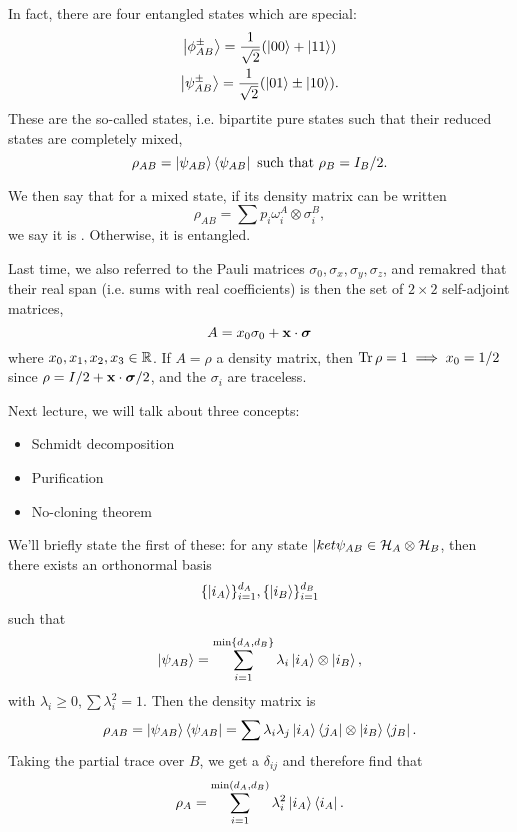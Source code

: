 In fact, there are four entangled states which are special:
\begin{gather}
    \left| \phi^\pm_{AB} \right>=\frac{1}{\sqrt{2}}(\left| 00 \right>+\left| 11 \right>)\\
    \left| \psi^\pm_{AB} \right> = \frac{1}{\sqrt{2}}(\left| 01 \right>\pm \left| 10 \right>).
\end{gather}
These are the so-called  states, i.e. bipartite pure states such that their reduced states are completely mixed,
\begin{equation}
    \rho_{AB}=\left| \psi_{AB} \right>\left< \psi_{AB} \right|\text{ such that }\rho_B=I_B/2.
\end{equation}

We then say that for a mixed state, if its density matrix can be written
\begin{equation}
    \rho_{AB} = \sum p_i \omega_i^A \otimes \sigma_i^B,
\end{equation}
we say it is . Otherwise, it is entangled.

Last time, we also referred to the Pauli matrices $\sigma_0,\sigma_x,\sigma_y,\sigma_z$, and remakred that their real span (i.e. sums with real coefficients) is then the set of $2\times 2$ self-adjoint matrices,
\begin{equation*}
    A=x_0\sigma_0 +\boldsymbol{\mathbf{x}} \cdot \mbox{\boldmath$ \sigma $}
\end{equation*}
where $x_0,x_1,x_2,x_3\in \mathbb{R}$. If $A=\rho$ a density matrix, then $\operatorname{Tr} \rho=1 \implies x_0=1/2$ since $\rho=I/2 + \boldsymbol{\mathbf{x}} \cdot \mbox{\boldmath$ \sigma $}/2$, and the $\sigma_i$ are traceless.

Next lecture, we will talk about three concepts:
\begin{itemize}
    \item Schmidt decomposition
    \item Purification
    \item No-cloning theorem
\end{itemize}
We'll briefly state the first of these: for any state $|ket{\psi_{AB}}\in \mathcal H_A \otimes \mathcal H_B$, then there exists an orthonormal basis
\begin{equation}
    \{\left| i_A \right>\}_{i=1}^{d_A},\{\left| i_B \right>\}_{i=1}^{d_B}
\end{equation}
such that
\begin{equation}
    \left| \psi_{AB} \right>=\sum_{i=1}^{\min\{d_A,d_B\}}\lambda_i \left| i_A \right>\otimes \left| i_B \right>,
\end{equation}
with $\lambda_i \geq 0, \sum \lambda_i^2 = 1$. Then the density matrix is
\begin{equation}
    \rho_{AB}=\left| \psi_{AB} \right>\left< \psi_{AB} \right| = \sum \lambda_i \lambda_j \left| i_A \right>\left< j_A \right|\otimes \left| i_B \right> \left< j_B \right|.
\end{equation}
Taking the partial trace over $B$, we get a $\delta_{ij}$ and therefore find that
\begin{equation}
    \rho_A= \sum_{i=1}^{\min(d_A,d_B)} \lambda_i^2 \left| i_A \right>\left< i_A \right|.
\end{equation}